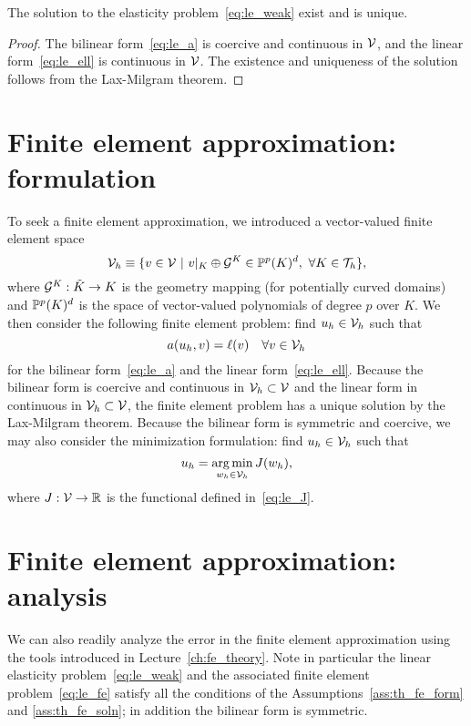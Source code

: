 \begin{proposition}
  The solution to the elasticity problem~\eqref{eq:le_weak} exist and is unique.
  \begin{proof}
    The bilinear form~\eqref{eq:le_a} is coercive and continuous in $\mathcal{V}$, and the linear form~\eqref{eq:le_ell} is continuous in $\mathcal{V}$.  The existence and  uniqueness of the solution follows from the Lax-Milgram theorem.
  \end{proof}
\end{proposition}

\section{Finite element approximation: formulation}
To seek a finite element approximation, we introduced a vector-valued finite element space
\begin{equation*}
  \mathcal{V}_h \equiv \{ v \in \mathcal{V} \ | \ v|_K \oplus \mathcal{G}^K \in \mathbb{P}^p(K)^d, \ \forall K \in \mathcal{T}_h \},
\end{equation*}
where $\mathcal{G}^K: \tilde K \to K$ is the geometry mapping (for potentially curved domains) and $\mathbb{P}^p(K)^d$ is the space of vector-valued polynomials of degree $p$ over $K$. We then consider the following finite element problem: find $u_h \in \mathcal{V}_h$ such that
\begin{equation}
  a(u_h,v) = \ell(v) \quad \forall v \in \mathcal{V}_h
  \label{eq:le_fe}
\end{equation}
for the bilinear form~\eqref{eq:le_a} and the linear form~\eqref{eq:le_ell}. Because the bilinear form is coercive and continuous in $\mathcal{V}_h \subset \mathcal{V}$ and the linear form in continuous in $\mathcal{V}_h \subset \mathcal{V}$, the finite element problem has a unique solution by the Lax-Milgram theorem. Because the bilinear form is symmetric and coercive, we may also consider the minimization formulation: find $u_h \in \mathcal{V}_h$ such that
\begin{equation*}
  u_h = \operatorname*{arg\,min}_{w_h \in \mathcal{V}_h} J(w_h),
\end{equation*}
where $J: \mathcal{V} \to \mathbb{R}$ is the functional defined in~\eqref{eq:le_J}.


\section{Finite element approximation: analysis}

We can also readily analyze the error in the finite element approximation using the tools introduced in Lecture~\ref{ch:fe_theory}. Note in particular the linear elasticity problem~\eqref{eq:le_weak} and the associated finite element problem~\eqref{eq:le_fe} satisfy all the conditions of the Assumptions~\ref{ass:th_fe_form} and \ref{ass:th_fe_soln}; in addition the bilinear form is symmetric.

